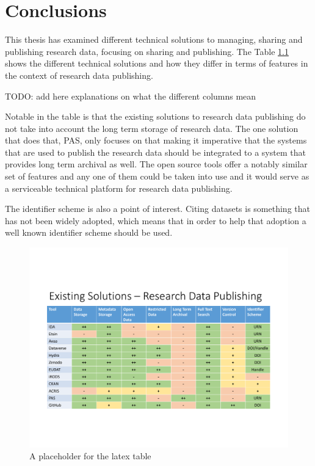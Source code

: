 \chapter{Conclusions}
\label{chapter:conclusions}

This thesis has examined different technical solutions to managing, sharing and
publishing research data, focusing on sharing and publishing. The Table
\ref{fig:solutions} shows the different technical solutions and how they
differ in terms of features in the context of research data publishing.

TODO: add here explanations on what the different columns mean

Notable in the table is that the existing solutions to research data publishing
do not take into account the long term storage of research data. The one
solution that does that, PAS, only focuses on that making it imperative that
the systems that are used to publish the research data should be integrated to
a system that provides long term archival as well. The open source tools offer
a notably similar set of features and any one of them could be taken into use
and it would serve as a serviceable technical platform for research data
publishing.

The identifier scheme is also a point of interest. Citing datasets is something
that has not been widely adopted, which means that in order to help that
adoption a well known identifier scheme should be used.

\begin{figure}
    \begin{centering}
        \includegraphics[width=\textwidth]{images/publishing}
    \end{centering}
    \caption{A placeholder for the latex table}
    \label{fig:solutions}
\end{figure}


